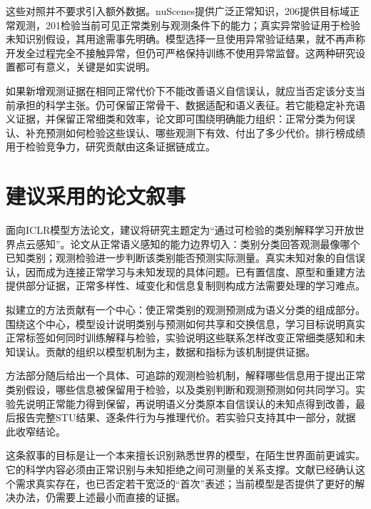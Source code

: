 \documentclass[11pt,a4paper]{article}
\begin{document}
这些对照并不要求引入额外数据。nuScenes提供广泛正常知识，206提供目标域正常观测，201检验当前可见正常类别与观测条件下的能力；真实异常验证用于检验未知识别假设，其用途需事先明确。模型选择一旦使用异常验证结果，就不再声称开发全过程完全不接触异常，但仍可严格保持训练不使用异常监督。这两种研究设置都可有意义，关键是如实说明。

如果新增观测证据在相同正常代价下不能改善语义自信误认，就应当否定该分支当前承担的科学主张。仍可保留正常骨干、数据适配和语义表征。若它能稳定补充语义证据，并保留正常细类和效率，论文即可围绕明确能力组织：正常分类为何误认、补充预测如何检验这些误认、哪些观测下有效、付出了多少代价。排行榜成绩用于检验竞争力，研究贡献由这条证据链成立。

\section{建议采用的论文叙事}

面向ICLR模型方法论文，建议将研究主题定为“通过可检验的类别解释学习开放世界点云感知”。论文从正常语义感知的能力边界切入：类别分类回答观测最像哪个已知类别；观测检验进一步判断该类别能否预测实际测量。真实未知对象的自信误认，因而成为连接正常学习与未知发现的具体问题。已有置信度、原型和重建方法提供部分证据，正常多样性、域变化和信息复制则构成方法需要处理的学习难点。

拟建立的方法贡献有一个中心：使正常类别的观测预测成为语义分类的组成部分。围绕这个中心，模型设计说明类别与预测如何共享和交换信息，学习目标说明真实正常标签如何同时训练解释与检验，实验说明这些联系怎样改变正常细类感知和未知误认。贡献的组织以模型机制为主，数据和指标为该机制提供证据。

方法部分随后给出一个具体、可追踪的观测检验机制，解释哪些信息用于提出正常类别假设，哪些信息被保留用于检验，以及类别判断和观测预测如何共同学习。实验先说明正常能力得到保留，再说明语义分类原本自信误认的未知点得到改善，最后报告完整STU结果、逐条件行为与推理代价。若实验只支持其中一部分，就据此收窄结论。

这条叙事的目标是让一个本来擅长识别熟悉世界的模型，在陌生世界面前更诚实。它的科学内容必须由正常识别与未知拒绝之间可测量的关系支撑。文献已经确认这个需求真实存在，也已否定若干宽泛的“首次”表述；当前模型是否提供了更好的解决办法，仍需要上述最小而直接的证据。

\clearpage
\end{document}
